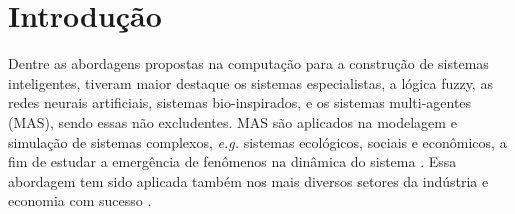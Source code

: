 
\begin{comment}
 contexto: simulação de sistemas ecológicos utilizando MAS
 motivação: simular sistemas complexos e de larga escala com plausabilidade biológica
 justificativa: assincronia intrínseca deste tipo de modelo é incompatível com os modelos de programação utilizando memória compartilhada
 objetivo: implementar um simulador escalável utilizando o modelo de atores, bem como um sistema nervoso assíncrono
 metodologia: usar o toolkit akka implementado na linguagem Java para construir o mundo e a criatura artificial, testar os circuitos de estimulação da dinâmica interna, verificar e validar o modela via simulação de forrageamento
 resultado: Escalabilidade. Espera-se fazer as simulações em larga escala e com os resultados compatíveis com a literatura
\end{comment}

\chapter{Introdução}
\label{chap:introducao}

Dentre as abordagens propostas na computação para a construção de sistemas inteligentes,
tiveram maior destaque os sistemas especialistas, a lógica fuzzy, as redes neurais artificiais,
sistemas bio-inspirados, e os sistemas multi-agentes (MAS), sendo essas não excludentes. MAS são aplicados na modelagem e simulação de sistemas complexos, \textit{e.g.} sistemas ecológicos, sociais e econômicos, a fim de estudar a emergência de fenômenos na dinâmica do sistema \cite{Niazi2011}. Essa abordagem tem sido aplicada também nos mais diversos setores da indústria e economia com sucesso \cite{Muller2014}.

